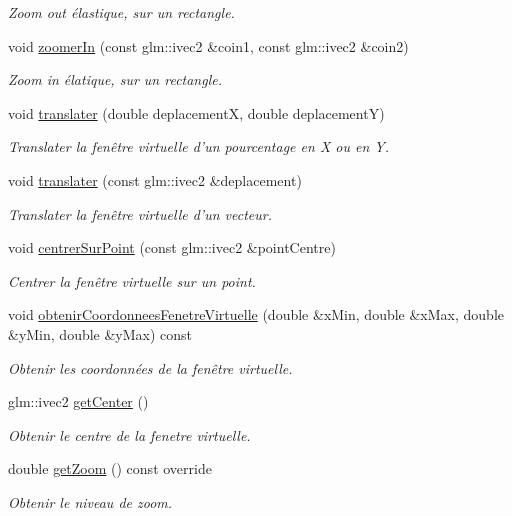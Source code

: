\begin{DoxyCompactItemize}
\begin{DoxyCompactList}\small\item\em Zoom out élastique, sur un rectangle. \end{DoxyCompactList}\item 
void \hyperlink{classvue_1_1_projection_ortho_a54482116f4c588f0404bc1a80926ab06}{zoomer\-In} (const glm\-::ivec2 \&coin1, const glm\-::ivec2 \&coin2)
\begin{DoxyCompactList}\small\item\em Zoom in élatique, sur un rectangle. \end{DoxyCompactList}\item 
void \hyperlink{classvue_1_1_projection_ortho_ab0b91a56bb059b3cb53c53c196fa9ad8}{translater} (double deplacement\-X, double deplacement\-Y)
\begin{DoxyCompactList}\small\item\em Translater la fenêtre virtuelle d'un pourcentage en {\itshape X} ou en {\itshape Y}. \end{DoxyCompactList}\item 
void \hyperlink{classvue_1_1_projection_ortho_af54b17d42826b1ebb396edf22ff66811}{translater} (const glm\-::ivec2 \&deplacement)
\begin{DoxyCompactList}\small\item\em Translater la fenêtre virtuelle d'un vecteur. \end{DoxyCompactList}\item 
void \hyperlink{classvue_1_1_projection_ortho_a8f50a13c2cd734d7a2b58c9bb1e5b89d}{centrer\-Sur\-Point} (const glm\-::ivec2 \&point\-Centre)
\begin{DoxyCompactList}\small\item\em Centrer la fenêtre virtuelle sur un point. \end{DoxyCompactList}\item 
void \hyperlink{classvue_1_1_projection_ortho_a6e2fe7110bcaa89dd4b10ba59aa3e72b}{obtenir\-Coordonnees\-Fenetre\-Virtuelle} (double \&x\-Min, double \&x\-Max, double \&y\-Min, double \&y\-Max) const 
\begin{DoxyCompactList}\small\item\em Obtenir les coordonnées de la fenêtre virtuelle. \end{DoxyCompactList}\item 
glm\-::ivec2 \hyperlink{classvue_1_1_projection_ortho_a84f149bf5b3cf035fff242081d64d90f}{get\-Center} ()
\begin{DoxyCompactList}\small\item\em Obtenir le centre de la fenetre virtuelle. \end{DoxyCompactList}\item 
double \hyperlink{classvue_1_1_projection_ortho_a46a36b0e1525d6e7b6eead4834a85ac4}{get\-Zoom} () const override
\begin{DoxyCompactList}\small\item\em Obtenir le niveau de zoom. \end{DoxyCompactList}\end{DoxyCompactItemize}
